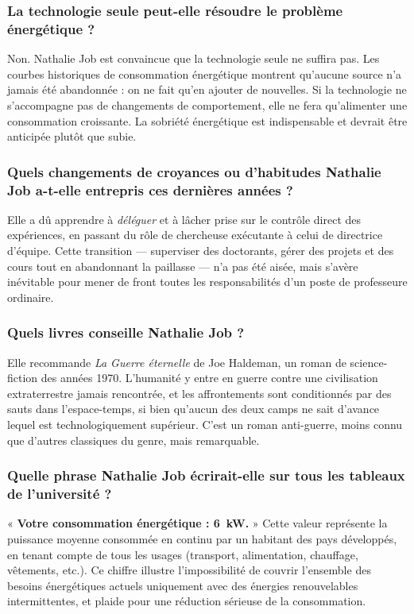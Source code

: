 \subsubsection{La technologie seule peut-elle résoudre le problème énergétique ?}

Non. Nathalie Job est convaincue que la technologie seule ne suffira pas. Les courbes historiques de consommation énergétique montrent qu'aucune source n'a jamais été abandonnée : on ne fait qu'en ajouter de nouvelles. Si la technologie ne s'accompagne pas de changements de comportement, elle ne fera qu'alimenter une consommation croissante. La sobriété énergétique est indispensable et devrait être anticipée plutôt que subie.

\subsubsection{Quels changements de croyances ou d'habitudes Nathalie Job a-t-elle entrepris ces dernières années ?}

Elle a dû apprendre à \textit{déléguer} et à lâcher prise sur le contrôle direct des expériences, en passant du rôle de chercheuse exécutante à celui de directrice d'équipe. Cette transition — superviser des doctorants, gérer des projets et des cours tout en abandonnant la paillasse — n'a pas été aisée, mais s'avère inévitable pour mener de front toutes les responsabilités d'un poste de professeure ordinaire.

\subsubsection{Quels livres conseille Nathalie Job ?}

Elle recommande \textit{La Guerre éternelle} de Joe Haldeman, un roman de science-fiction des années 1970. L'humanité y entre en guerre contre une civilisation extraterrestre jamais rencontrée, et les affrontements sont conditionnés par des sauts dans l'espace-temps, si bien qu'aucun des deux camps ne sait d'avance lequel est technologiquement supérieur. C'est un roman anti-guerre, moins connu que d'autres classiques du genre, mais remarquable.

\subsubsection{Quelle phrase Nathalie Job écrirait-elle sur tous les tableaux de l'université ?}

« \textbf{Votre consommation énergétique : 6~kW.} » Cette valeur représente la puissance moyenne consommée en continu par un habitant des pays développés, en tenant compte de tous les usages (transport, alimentation, chauffage, vêtements, etc.). Ce chiffre illustre l'impossibilité de couvrir l'ensemble des besoins énergétiques actuels uniquement avec des énergies renouvelables intermittentes, et plaide pour une réduction sérieuse de la consommation.

